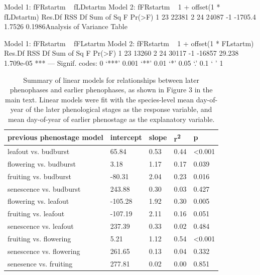 \documentclass{article}
\begin{document}
Model 1: fFRstartm ~ fLDstartm
Model 2: fFRstartm ~ 1 + offset(1 * fLDstartm)
  Res.Df   RSS Df Sum of Sq      F Pr(>F)
1     23 22381                           
2     24 24087 -1   -1705.4 1.7526 0.1986Analysis of Variance Table

Model 1: fFRstartm ~ fFLstartm
Model 2: fFRstartm ~ 1 + offset(1 * FLstartm)
  Res.Df   RSS Df Sum of Sq      F    Pr(>F)    
1     23 13260                                  
2     24 30117 -1    -16857 29.238 1.709e-05 ***
---
Signif. codes:  0 ‘***’ 0.001 ‘**’ 0.01 ‘*’ 0.05 ‘.’ 0.1 ‘ ’ 1%
\begin{table}[ht]
\centering
\caption{Summary of linear models for relationships between later phenophases and earlier phenophases, as shown in Figure 3 in the main text. Linear models were fit with the species-level mean day-of-year of the later phenological stages as the response variable,
and mean day-of-year of earlier phenostage as the explanatory variable.} 
\label{table:prevphase}
\begin{tabular}{|p{}|p{}|p{}|p{}|p{}|}
  \hline
previous phenostage model & intercept & slope & r\textsuperscript{2} & p \\ 
  \hline
leafout vs. budburst & 65.84 & 0.53 & 0.44 & <0.001 \\ 
  flowering vs. budburst & 3.18 & 1.17 & 0.17 & 0.039 \\ 
  fruiting vs. budburst & -80.31 & 2.04 & 0.23 & 0.016 \\ 
  senescence vs. budburst & 243.88 & 0.30 & 0.03 & 0.427 \\ 
  flowering vs. leafout & -105.28 & 1.92 & 0.30 & 0.005 \\ 
  fruiting vs. leafout & -107.19 & 2.11 & 0.16 & 0.051 \\ 
  senescence vs. leafout & 237.39 & 0.33 & 0.02 & 0.484 \\ 
  fruiting vs. flowering & 5.21 & 1.12 & 0.54 & <0.001 \\ 
  senescence vs. flowering & 261.65 & 0.13 & 0.04 & 0.332 \\ 
  senesence vs. fruiting & 277.81 & 0.02 & 0.00 & 0.851 \\ 
   \hline
\end{tabular}
\end{table}%
\end{document}
